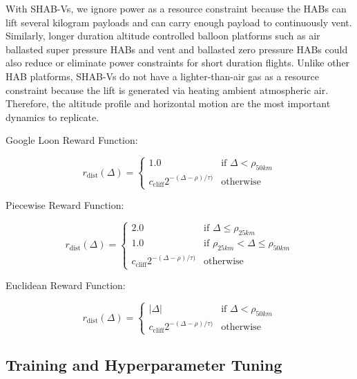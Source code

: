 With SHAB-Vs, we ignore power as a resource constraint because the HABs can lift several kilogram payloads and can carry enough payload to continuously vent. Similarly, longer duration altitude controlled balloon platforms such as air ballasted super pressure HABs and vent and ballasted zero pressure HABs could also reduce or eliminate power constraints for short duration flights.  Unlike other HAB platforms, SHAB-Vs do not have a lighter-than-air gas as a resource constraint because the lift is generated via heating ambient atmospheric air.  Therefore, the altitude profile and horizontal motion are the most important dynamics to replicate.

Google Loon Reward Function:

\begin{equation}
r_{\mathrm{dist}}(\Delta) =
    \begin{cases}
        1.0 & \text{if } \Delta < \rho_{50km} \\
        c_{\mathrm{cliff}}2^{-(\Delta-\rho)/\tau)} & \text{otherwise }
    \end{cases}
    \label{eq:google}
\end{equation}

Piecewise Reward Function:

\begin{equation}
r_{\mathrm{dist}}(\Delta) =
    \begin{cases}
        2.0 & \text{if } \Delta \leq \rho_{25km} \\
        1.0 & \text{if }  \rho_{25km} < \Delta \leq \rho_{50km} \\
        c_{\mathrm{cliff}}2^{-(\Delta-\rho)/\tau)} & \text{otherwise }
    \end{cases}
    \label{piecewise_reard}
\end{equation}

Euclidean Reward Function:

\begin{equation}
r_{\mathrm{dist}}(\Delta) =
    \begin{cases}
        |\Delta| & \text{if } \Delta < \rho_{50km} \\
        c_{\mathrm{cliff}}2^{-(\Delta-\rho)/\tau)} & \text{otherwise }
    \end{cases}
    \label{euclidan_reard}
\end{equation}



\subsection{Training and Hyperparameter Tuning}\label{section:SimEnvforDQN_TrainingAndHyperparam}

